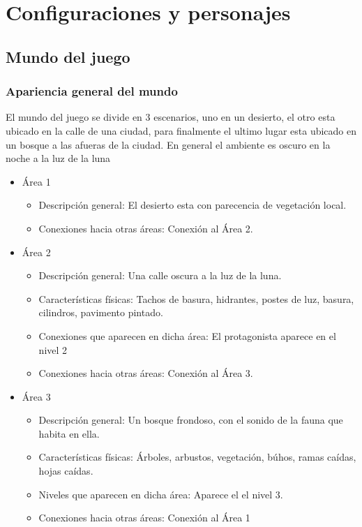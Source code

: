 \section{Configuraciones y personajes}
\subsection{Mundo del juego}
\subsubsection{Apariencia general del mundo}

El mundo del juego se divide en 3 escenarios, uno en un desierto, el otro esta
ubicado en la calle de una ciudad, para finalmente
el ultimo lugar esta ubicado en un bosque a las afueras de la
ciudad. En general el ambiente es oscuro en la noche a la luz de la luna

\begin{itemize}
	\item Área 1
	      \begin{itemize}
		      \item Descripción general: El desierto esta con parecencia de vegetación local.
		      \item Conexiones hacia otras áreas: Conexión al Área 2.
	      \end{itemize}
	\item Área 2
	      \begin{itemize}
		      \item Descripción general: Una calle oscura a la luz de la luna.
		      \item Características físicas: Tachos de basura, hidrantes, postes de luz, basura,
		            cilindros, pavimento pintado.
		      \item Conexiones que aparecen en dicha área: El protagonista aparece en el nivel 2
		      \item Conexiones hacia otras áreas: Conexión al Área 3.
	      \end{itemize}
	\item Área 3
	      \begin{itemize}
		      \item Descripción general: Un bosque frondoso, con el sonido de la fauna
		            que habita en ella.
		      \item Características físicas: Árboles, arbustos, vegetación, búhos, ramas caídas, hojas
		            caídas.
		      \item Niveles que aparecen en dicha área: Aparece el el nivel 3.
		      \item Conexiones hacia otras áreas: Conexión al Área 1
	      \end{itemize}
\end{itemize}

